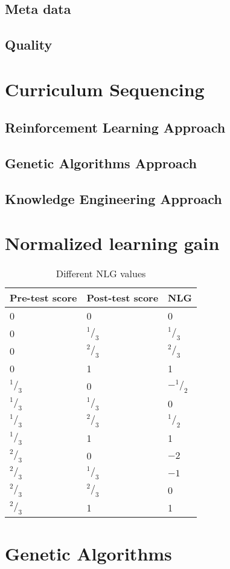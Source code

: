 \subsection{Meta data}
\subsection{Quality}
\section{Curriculum Sequencing}
\subsection{Reinforcement Learning Approach}
\subsection{Genetic Algorithms Approach}
\subsection{Knowledge Engineering Approach}
\section{Normalized learning gain}
\begin{table}
	\centering
	\begin{tabular}{lll}\hline
		\textbf{Pre-test score} & \textbf{Post-test score} & \textbf{NLG} \\\hline
		0		& 0			& 0 \\
		0		& $^1/_3$	& $^1/_3$\\
		0		& $^2/_3$	& $^2/_3$\\
		0		& 1			& 1\\
		$^1/_3$	& 0			& $-^1/_2$\\
		$^1/_3$	& $^1/_3$	& 0\\
		$^1/_3$	& $^2/_3$	& $^1/_2$\\
		$^1/_3$	& 1			& 1\\
		$^2/_3$	& 0			& $-2$\\
		$^2/_3$	& $^1/_3$	& $-1$\\
		$^2/_3$	& $^2/_3$	& 0\\
		$^2/_3$	& 1			& 1\\
	\end{tabular}
	\caption{Different NLG values}
	\label{tab:nlg_values}
\end{table}
\section{Genetic Algorithms}

